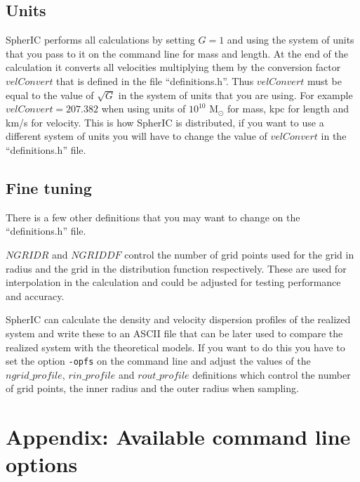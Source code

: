 \documentclass[letterpaper,10pt]{article}
\begin{document}
\subsection{Units}
SpherIC performs all calculations by setting $G = 1$ and using the system of units that you pass to it on the command line for mass and length. At the end of the calculation it converts all velocities multiplying them by the conversion factor $velConvert$ that is defined in the file ``definitions.h''. Thus $velConvert$ must be equal to the value of $\sqrt{G}$ in the system of units that you are using. For example $velConvert = 207.382$ when using units of $10^{10}$ $\mathrm{M}_{\odot}$ for mass, kpc for length and km/s for velocity. This is how SpherIC is distributed, if you want to use a different system of units you will have to change the value of $velConvert$ in the ``definitions.h'' file.

\subsection{Fine tuning}
There is a few other definitions that you may want to change on the ``definitions.h'' file.

 $NGRIDR$ and $NGRIDDF$ control the number of grid points used for the grid in radius and the grid in the distribution function respectively. These are used for interpolation in the calculation and could be adjusted for testing performance and accuracy.

SpherIC can calculate the density and velocity dispersion profiles of the realized system and write these to an ASCII file that can be later used to compare the realized system with the theoretical models. If you want to do this you have to set the option \texttt{-opfs} on the command line and adjust the values of  the $ngrid\_profile$, $rin\_profile$ and $rout\_profile$ definitions which control the number of grid points, the inner radius and the outer radius when sampling.

\section{Appendix: Available command line options}
\end{document}
